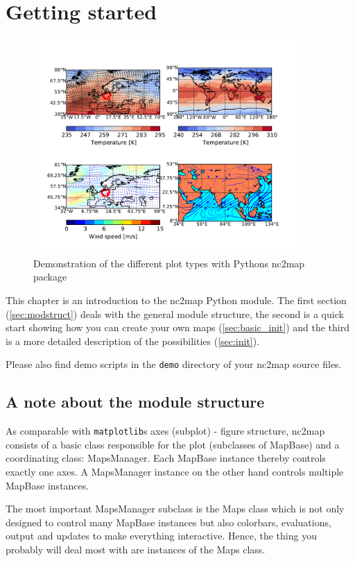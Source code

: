 \chapter{Getting started}
\begin{figure}[t]
	\includegraphics[width=0.9\textwidth]{figures/demo-plot-types.pdf}
	\caption{Demonstration of the different plot types with Pythons nc2map package}
	\label{fig:demo}
\end{figure}
This chapter is an introduction to the \gls{nc2map} Python module. The first section (\autoref{sec:modstruct}) deals with the general module structure, the second is a quick start showing how you can create your own maps (\autoref{sec:basic_init}) and the third is a more detailed description of the possibilities (\autoref{sec:init}).

Please also find demo scripts in the \lstinline|demo| directory of your \gls{nc2map} source files.

\section{A note about the module structure} \label{sec:modstruct}
As comparable with \lstinline|matplotlib|s axes (subplot) - figure structure, \gls{nc2map} consists of a basic class responsible for the plot (subclasses of \gls{MapBase}) and a coordinating class: \gls{MapsManager}. Each \gls{MapBase} instance thereby controls exactly one axes. A \gls{MapsManager} instance on the other hand controls multiple \gls{MapBase} instances. 

The most important \gls{MapsManager} subclass is the \gls{Maps} class which is not only designed to control many \gls{MapBase} instances but also colorbars, evaluations, output and updates to make everything interactive. Hence, the thing you probably will deal most with are instances of the \gls{Maps} class.

